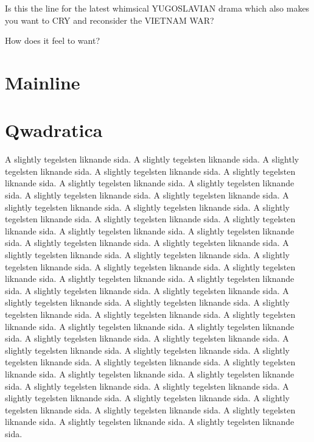 \documentclass[cropmarks, frame, english]{idamasterthesis}
\begin{document}
Is this the line for the latest whimsical YUGOSLAVIAN drama which also
 makes you want to CRY and reconsider the VIETNAM WAR?

How does it feel to want?

\section{Mainline}

\section{Qwadratica}

A slightly tegelsten liknande sida. 
A slightly tegelsten liknande sida. 
A slightly tegelsten liknande sida. 
A slightly tegelsten liknande sida. 
A slightly tegelsten liknande sida. 
A slightly tegelsten liknande sida. 
A slightly tegelsten liknande sida. 
A slightly tegelsten liknande sida. 
A slightly tegelsten liknande sida. 
A slightly tegelsten liknande sida. 
A slightly tegelsten liknande sida. 
A slightly tegelsten liknande sida. 
A slightly tegelsten liknande sida. 
A slightly tegelsten liknande sida. 
A slightly tegelsten liknande sida. 
A slightly tegelsten liknande sida. 
A slightly tegelsten liknande sida. 
A slightly tegelsten liknande sida. 
A slightly tegelsten liknande sida. 
A slightly tegelsten liknande sida. 
A slightly tegelsten liknande sida. 
A slightly tegelsten liknande sida. 
A slightly tegelsten liknande sida. 
A slightly tegelsten liknande sida. 
A slightly tegelsten liknande sida. 
A slightly tegelsten liknande sida. 
A slightly tegelsten liknande sida. 
A slightly tegelsten liknande sida. 
A slightly tegelsten liknande sida. 
A slightly tegelsten liknande sida. 
A slightly tegelsten liknande sida. 
A slightly tegelsten liknande sida. 
A slightly tegelsten liknande sida. 
A slightly tegelsten liknande sida. 
A slightly tegelsten liknande sida. 
A slightly tegelsten liknande sida. 
A slightly tegelsten liknande sida. 
A slightly tegelsten liknande sida. 
A slightly tegelsten liknande sida. 
A slightly tegelsten liknande sida. 
A slightly tegelsten liknande sida. 
A slightly tegelsten liknande sida. 
A slightly tegelsten liknande sida. 
A slightly tegelsten liknande sida. 
A slightly tegelsten liknande sida. 
A slightly tegelsten liknande sida. 
A slightly tegelsten liknande sida. 
A slightly tegelsten liknande sida. 
A slightly tegelsten liknande sida. 
A slightly tegelsten liknande sida. 
A slightly tegelsten liknande sida. 
A slightly tegelsten liknande sida. 
\end{document}
